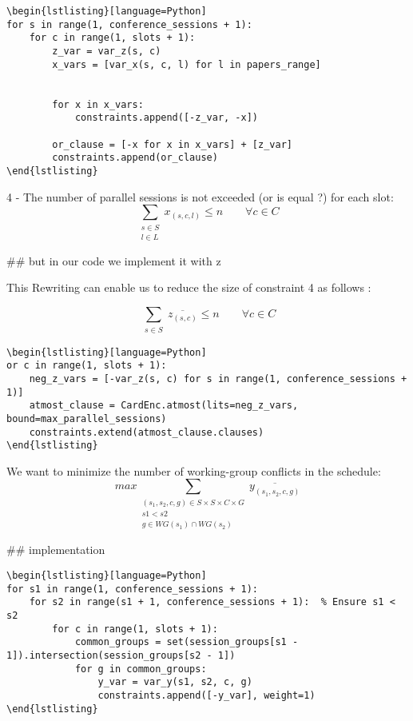 \documentclass{article}
\begin{document}
\begin{verbatim}
\begin{lstlisting}[language=Python]
for s in range(1, conference_sessions + 1):
    for c in range(1, slots + 1):
        z_var = var_z(s, c)
        x_vars = [var_x(s, c, l) for l in papers_range]

        
        for x in x_vars:
            constraints.append([-z_var, -x])

        or_clause = [-x for x in x_vars] + [z_var]
        constraints.append(or_clause)
\end{lstlisting}
\end{verbatim}

4 - The number of parallel sessions is not exceeded (or is equal ?) for each slot:
$$ \sum_{\substack{s\in S\\ l\in L}} x_{(s,c,l)} \leq n \qquad \forall c \in C $$

## but in our code we implement it with z 

 This Rewriting can enable us to reduce the size of constraint 4 as follows :

$$ \sum_{\substack{s\in S}} \overline{z_{(s,c)}} \leq n \qquad \forall c \in C $$

\begin{verbatim}
\begin{lstlisting}[language=Python]
or c in range(1, slots + 1):
    neg_z_vars = [-var_z(s, c) for s in range(1, conference_sessions + 1)]
    atmost_clause = CardEnc.atmost(lits=neg_z_vars, bound=max_parallel_sessions)
    constraints.extend(atmost_clause.clauses)
\end{lstlisting}
\end{verbatim}

We want to minimize the number of working-group conflicts in the schedule:
$$ max \sum_{\substack{(s_1,s_2,c,g)\in S\times S\times C\times G \\ s1<s2 \\ g\in WG(s_1)\cap WG(s_2)}} \overline{y_{(s_1,s_2,c,g)}} $$

## implementation 
\begin{verbatim}
\begin{lstlisting}[language=Python]
for s1 in range(1, conference_sessions + 1):
    for s2 in range(s1 + 1, conference_sessions + 1):  % Ensure s1 < s2
        for c in range(1, slots + 1):
            common_groups = set(session_groups[s1 - 1]).intersection(session_groups[s2 - 1])
            for g in common_groups:
                y_var = var_y(s1, s2, c, g)
                constraints.append([-y_var], weight=1)
\end{lstlisting}
\end{verbatim}
\end{document}
